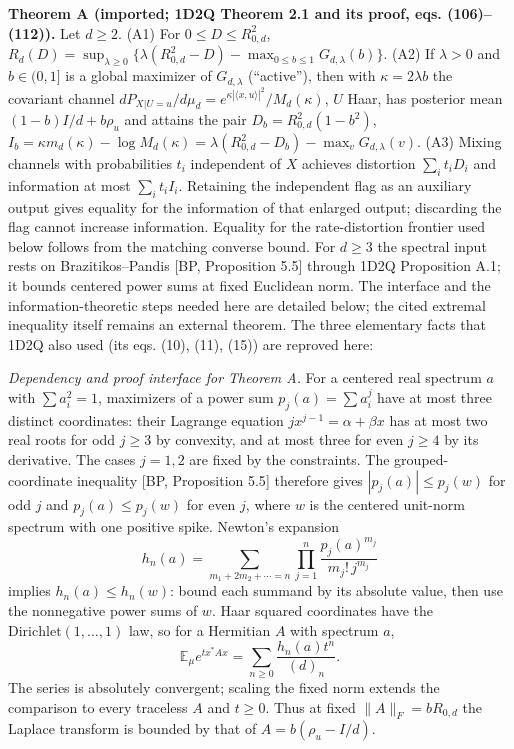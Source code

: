 \documentclass[
  11pt,
  a4paper,
]{article}
\begin{document}
\textbf{Theorem A (imported; 1D2Q Theorem 2.1 and its proof, eqs.
(106)--(112)).} Let \(d\ge2\). (A1) For \(0\le D\le R_{0,\allowbreak{}d}^2\),
\(R_d(D)=\sup_{\lambda\ge0}\{\lambda(R_{0,\allowbreak{}d}^2-D)-\max_{0\le b\le1}G_{d,\allowbreak{}\lambda}(b)\}\).
(A2) If \(\lambda>0\) and \(b\in(0,\allowbreak{}1]\) is a global maximizer of
\(G_{d,\allowbreak{}\lambda}\) (``active''), then with \(\kappa=2\lambda b\) the
covariant channel
\(dP_{X|U=u}/d\mu_d=e^{\kappa|\langle x,\allowbreak{}u\rangle|^2}/M_d(\kappa)\),
\(U\) Haar, has posterior mean \((1-b)I/d+b\rho_u\) and attains the pair
\(D_b=R_{0,\allowbreak{}d}^2(1-b^2)\),
\(I_b=\kappa m_d(\kappa)-\log M_d(\kappa)=\lambda(R_{0,\allowbreak{}d}^2-D_b)-\max_vG_{d,\allowbreak{}\lambda}(v)\).
(A3) Mixing channels with probabilities \(t_i\) independent of \(X\)
achieves distortion \(\sum_i t_iD_i\) and information at most
\(\sum_i t_iI_i\). Retaining the independent flag as an auxiliary output
gives equality for the information of that enlarged output; discarding
the flag cannot increase information. Equality for the rate-distortion
frontier used below follows from the matching converse bound. For
\(d\ge3\) the spectral input rests on Brazitikos--Pandis {[}BP,
Proposition 5.5{]} through 1D2Q Proposition A.1; it bounds centered
power sums at fixed Euclidean norm. The interface and the
information-theoretic steps needed here are detailed below; the cited
extremal inequality itself remains an external theorem. The three
elementary facts that 1D2Q also used (its eqs. (10), (11), (15)) are
reproved here:

\emph{Dependency and proof interface for Theorem A.} For a centered real
spectrum \(a\) with \(\sum a_i^2=1\), maximizers of a power sum
\(p_j(a)=\sum a_i^j\) have at most three distinct coordinates: their
Lagrange equation \(j x^{j-1}=\alpha+\beta x\) has at most two real
roots for odd \(j\ge3\) by convexity, and at most three for even
\(j\ge4\) by its derivative. The cases \(j=1,\allowbreak{}2\) are fixed by the
constraints. The grouped-coordinate inequality {[}BP, Proposition 5.5{]}
therefore gives \(|p_j(a)|\le p_j(w)\) for odd \(j\) and
\(p_j(a)\le p_j(w)\) for even \(j\), where \(w\) is the centered
unit-norm spectrum with one positive spike. Newton's expansion
\[h_n(a)=\sum_{m_1+2m_2+\cdots=n}\prod_{j=1}^n\frac{p_j(a)^{m_j}}{m_j!\,j^{m_j}}\]
implies \(h_n(a)\le h_n(w)\): bound each summand by its absolute value,
then use the nonnegative power sums of \(w\). Haar squared coordinates
have the \(\mathrm{Dirichlet}(1,\allowbreak{}\ldots,\allowbreak{}1)\) law, so for a Hermitian
\(A\) with spectrum \(a\),
\[\mathbb E_\mu e^{t x^*Ax}=\sum_{n\ge0}\frac{h_n(a)t^n}{(d)_n}.\] The
series is absolutely convergent; scaling the fixed norm extends the
comparison to every traceless \(A\) and \(t\ge0\). Thus at fixed
\(\|A\|_F=bR_{0,\allowbreak{}d}\) the Laplace transform is bounded by that of
\(A=b(\rho_u-I/d)\).
\end{document}
